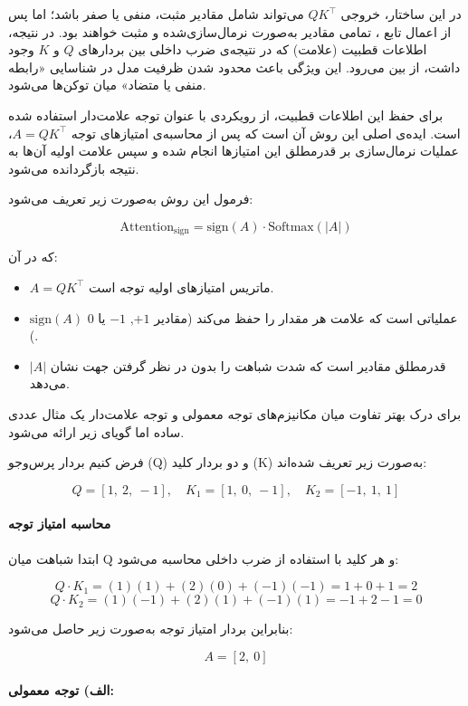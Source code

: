در این ساختار، خروجی $QK^\top$ می‌تواند شامل مقادیر مثبت، منفی یا صفر باشد؛ اما پس از اعمال تابع ، تمامی مقادیر به‌صورت نرمال‌سازی‌شده و مثبت خواهند بود. در نتیجه، اطلاعات قطبیت (علامت) که در نتیجه‌ی ضرب داخلی بین بردارهای $Q$ و $K$ وجود داشت، از بین می‌رود. این ویژگی باعث محدود شدن ظرفیت مدل در شناسایی «رابطه منفی یا متضاد» میان توکن‌ها می‌شود.

برای حفظ این اطلاعات قطبیت، از رویکردی با عنوان توجه علامت‌دار استفاده شده است. ایده‌ی اصلی این روش آن است که پس از محاسبه‌ی امتیازهای توجه $A = QK^\top$، عملیات نرمال‌سازی  بر قدرمطلق این امتیازها انجام شده و سپس علامت اولیه آن‌ها به نتیجه بازگردانده می‌شود.

فرمول این روش به‌صورت زیر تعریف می‌شود:

\begin{equation}
	\text{Attention}_{\text{sign}} = \text{sign}(A) \cdot \text{Softmax}(|A|)
\end{equation}

که در آن:
\begin{itemize}
	\item $A = QK^\top$ ماتریس امتیازهای اولیه توجه است.
	\item $\text{sign}(A)$ عملیاتی است که علامت هر مقدار را حفظ می‌کند (مقادیر $+1$, $-1$ یا $0$).
	\item $|A|$ قدرمطلق مقادیر است که شدت شباهت را بدون در نظر گرفتن جهت نشان می‌دهد.
\end{itemize}

برای درک بهتر تفاوت میان مکانیزم‌های توجه معمولی و توجه علامت‌دار یک مثال عددی ساده اما گویای زیر ارائه می‌شود.

فرض کنیم بردار پرس‌وجو (Q) و دو بردار کلید (K) به‌صورت زیر تعریف شده‌اند:

\[
Q = [1,\ 2,\ -1], \quad
K_1 = [1,\ 0,\ -1], \quad
K_2 = [-1,\ 1,\ 1]
\]

\paragraph{محاسبه امتیاز توجه}

ابتدا شباهت میان Q و هر کلید با استفاده از ضرب داخلی محاسبه می‌شود:

\[
Q \cdot K_1 = (1)(1) + (2)(0) + (-1)(-1) = 1 + 0 + 1 = 2
\]
\[
Q \cdot K_2 = (1)(-1) + (2)(1) + (-1)(1) = -1 + 2 -1 = 0
\]

بنابراین بردار امتیاز توجه به‌صورت زیر حاصل می‌شود:

\[
A = [2,\ 0]
\]

\paragraph{الف) توجه معمولی:}

